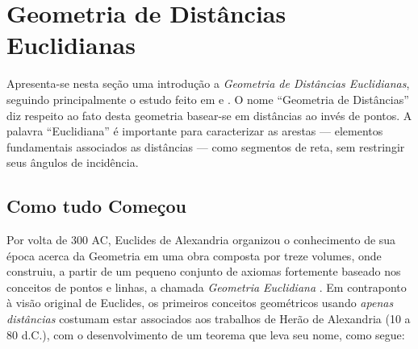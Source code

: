 \section{Geometria de Distâncias Euclidianas\label{sec:GD}}
Apresenta-se nesta seção uma introdução a \textit{Geometria de Distâncias Euclidianas}, seguindo principalmente o estudo feito em \cite{libertiEDG} e \cite{carlileGDandAplications}. O nome ``Geometria de Distâncias'' diz respeito ao fato desta geometria basear-se em distâncias ao invés de pontos. A palavra ``Euclidiana'' é importante para caracterizar as arestas --- elementos fundamentais associados as distâncias --- como segmentos de reta, sem restringir seus ângulos de incidência.

\subsection{Como tudo Começou}

Por volta de 300 AC, Euclides de Alexandria organizou o conhecimento de sua época acerca da Geometria em uma obra composta por treze volumes, onde construiu, a partir de um pequeno conjunto de axiomas fortemente baseado nos conceitos de pontos e linhas, a chamada \textit{Geometria Euclidiana} \cite{elementosEuclides}. Em contraponto à visão original de Euclides, os primeiros conceitos geométricos usando \textit{apenas distâncias} costumam estar associados aos trabalhos de Herão de Alexandria (10 a 80 d.C.), com o desenvolvimento de um teorema que leva seu nome, como segue: 

